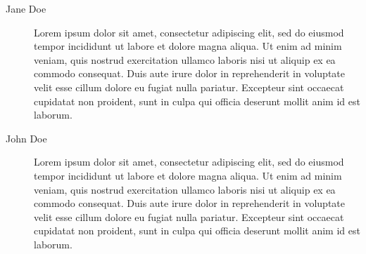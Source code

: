 \begin{description}
	\item[Jane Doe] Lorem ipsum dolor sit amet, consectetur adipiscing elit, sed do eiusmod tempor incididunt ut labore et dolore magna aliqua. Ut enim ad minim veniam, quis nostrud exercitation ullamco laboris nisi ut aliquip ex ea commodo consequat. Duis aute irure dolor in reprehenderit in voluptate velit esse cillum dolore eu fugiat nulla pariatur. Excepteur sint occaecat cupidatat non proident, sunt in culpa qui officia deserunt mollit anim id est laborum.
	\item[John Doe] Lorem ipsum dolor sit amet, consectetur adipiscing elit, sed do eiusmod tempor incididunt ut labore et dolore magna aliqua. Ut enim ad minim veniam, quis nostrud exercitation ullamco laboris nisi ut aliquip ex ea commodo consequat. Duis aute irure dolor in reprehenderit in voluptate velit esse cillum dolore eu fugiat nulla pariatur. Excepteur sint occaecat cupidatat non proident, sunt in culpa qui officia deserunt mollit anim id est laborum.

\end{description}
